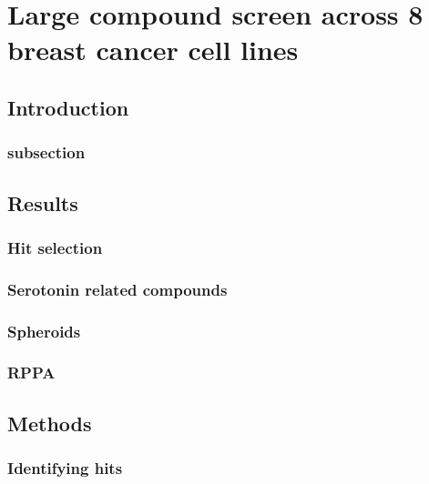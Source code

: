 \documentclass[a4paper,11pt,twoside,openright]{scrbook}
\begin{document}
\chapter{Large compound screen across 8 breast cancer cell lines} \label{chapter:screen}




\section{Introduction}

\subsection{subsection}



\section{Results}

\subsection{Hit selection}

\subsection{Serotonin related compounds}

\subsection{Spheroids}

\subsection{RPPA}


\section{Methods}

\subsection{Identifying hits}
\end{document}
